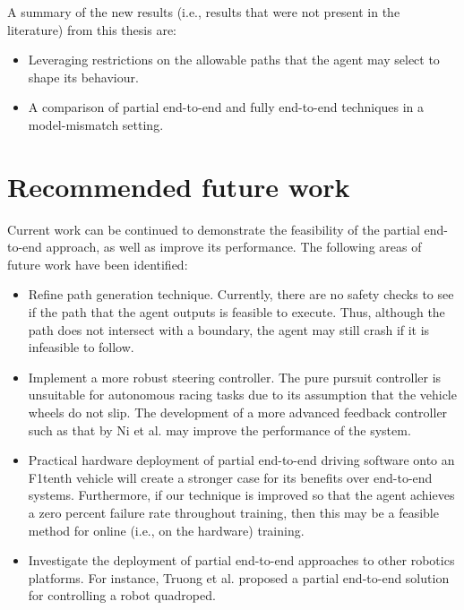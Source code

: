 
A summary of the new results (i.e., results that were not present in the literature) from this thesis are:

\begin{itemize}
    \item Leveraging restrictions on the allowable paths that the agent may select to shape its behaviour.
    \item A comparison of partial end-to-end and fully end-to-end techniques in a model-mismatch setting. 
\end{itemize}


\section{Recommended future work}
Current work can be continued to demonstrate the feasibility of the partial end-to-end approach, as well as improve its performance.
The following areas of future work have been identified:

\begin{itemize}
    \item Refine path generation technique. Currently, there are no safety checks to see if the path that the agent outputs is feasible to execute. Thus, although the path does not intersect with a boundary, the agent may still crash if it is infeasible to follow. 

    \item Implement a more robust steering controller. The pure pursuit controller is unsuitable for autonomous racing tasks due to its assumption that the vehicle wheels do not slip. The development of a more advanced feedback controller such as that by Ni et al. \cite{Ni2017} may improve the performance of the system. 

    \item Practical hardware deployment of partial end-to-end driving software onto an F1tenth vehicle will create a stronger case for its benefits over end-to-end systems. 
    Furthermore, if our technique is improved so that the agent achieves a zero percent failure rate throughout training, then this may be a feasible method for online (i.e., on the hardware) training.

    \item Investigate the deployment of partial end-to-end approaches to other robotics platforms.
    For instance, Truong et al. \cite{Truong2022} proposed a partial end-to-end solution for controlling a robot quadroped.
\end{itemize}



